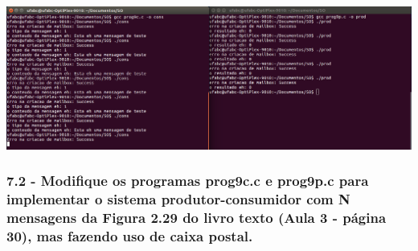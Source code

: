 \vspace{2em}
\begin{minipage}{\textwidth}
    \hspace{-1em}
    \centering
    \includegraphics[trim=0 0 0 0,clip,scale=.3]{pratica1/prog9.png}
    \label{prog4modpng}
    \hspace{1em}
\end{minipage}

\subsubsection{7.2 - Modiﬁque os programas prog9c.c e prog9p.c para implementar o sistema produtor-consumidor com N mensagens da Figura 2.29 do livro texto (Aula 3 - página 30), mas fazendo uso de caixa postal.}

\vspace{-0.5em}
\begin{minipage}{\textwidth}
    \hspace{1em}
    \centering
    \begin{minipage}[t]{0.475\textwidth}
        \centering
        
        \label{prog4mod}
    \end{minipage}
    \hfill
    \begin{minipage}[t]{0.475\textwidth}
        \centering
        
        \label{prog4mod}
    \end{minipage}
    \hspace{1em}
    \\[-3pt]
    \hspace{1em}
    \begin{minipage}[t]{.475\linewidth}
        \centering
    \end{minipage}%
    \hfill%
    \begin{minipage}[t]{.475\linewidth}
        \centering
    \end{minipage}%
    \hspace{1em}
\end{minipage}
\vspace{1em}

